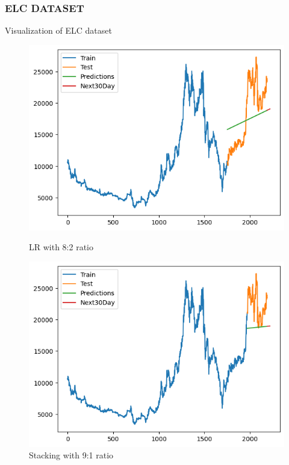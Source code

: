 \documentclass[conference]{IEEEtran}
\begin{document}
\subsubsection{ELC DATASET}  {Visualization of ELC dataset}

\begin{figure}[H]
    \centering
    \begin{minipage}{0.24\textwidth}
        \centering
        \includegraphics[width=\textwidth]{Figure/ELC/linear82.png}
        \caption{LR with 8:2 ratio}
        \label{fig:image1}
    \end{minipage}
    \hfill
    \begin{minipage}{0.24\textwidth}
        \centering
        \includegraphics[width=\textwidth]{Figure/ELC/stacking91.png}
        \caption{Stacking with 9:1 ratio}
        \label{fig:image2}
    \end{minipage}
\end{figure}
\end{document}
